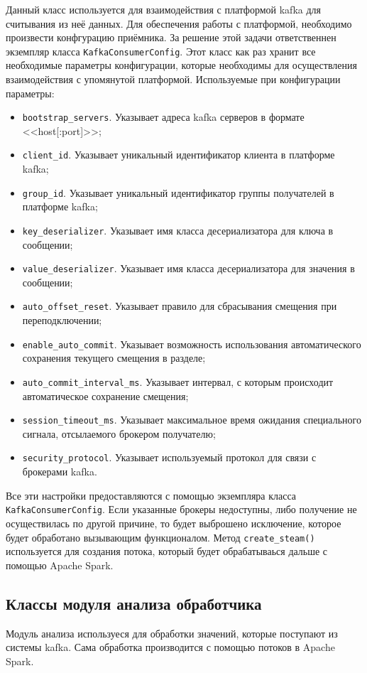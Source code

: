Данный класс используется для взаимодействия с платформой kafka для считывания из неё данных.
Для обеспечения работы с платформой, необходимо произвести конфгурацию приёмника.
За решение этой задачи ответственнен экземпляр класса \texttt{KafkaConsumerConfig}.
Этот класс как раз хранит все необходимые параметры конфигурации, которые необходимы для осуществления взаимодействия с упомянутой платформой.
Используемые при конфигурации параметры:
\begin{itemize}
    \item \texttt{bootstrap\_servers}. Указывает адреса kafka серверов в формате <<host[:port]>>;
    \item \texttt{client\_id}. Указывает уникальный идентификатор клиента в платформе kafka;
    \item \texttt{group\_id}. Указывает уникальный идентификатор группы получателей в платформе kafka;
    \item \texttt{key\_deserializer}. Указывает имя класса десериализатора для ключа в сообщении;
    \item \texttt{value\_deserializer}. Указывает имя класса десериализатора для значения в сообщении;
    \item \texttt{auto\_offset\_reset}. Указывает правило для сбрасывания смещения при переподключении;
    \item \texttt{enable\_auto\_commit}. Указывает возможность использования автоматического сохранения текущего смещения в разделе;
    \item \texttt{auto\_commit\_interval\_ms}. Указывает интервал, с которым происходит автоматическое сохранение смещения;
    \item \texttt{session\_timeout\_ms}. Указывает максимальное время ожидания специального сигнала, отсылаемого брокером получателю;
    \item \texttt{security\_protocol}. Указывает используемый протокол для связи с брокерами kafka.
\end{itemize}

Все эти настройки предоставляются с помощью экземпляра класса \texttt{KafkaConsumerConfig}.
Если указанные брокеры недоступны, либо получение не осуществилась по другой причине, то будет выброшено исключение, которое будет обработано вызывающим функционалом.
Метод \texttt{create\_steam()} используется для создания потока, который будет обрабатываься дальше с помощью Apache Spark.


\subsection{Классы модуля анализа обработчика}
Модуль анализа используеся для обработки значений, которые поступают из системы kafka.
Сама обработка производится с помощью потоков в Apache Spark.

